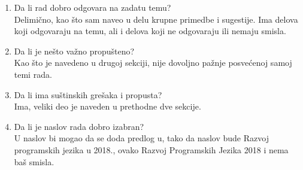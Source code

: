 \documentclass[a4paper]{report}
\begin{document}
\begin{enumerate}
\item Da li rad dobro odgovara na zadatu temu?\\
Delimično, kao što sam naveo u delu krupne primedbe i sugestije. Ima delova koji odgovaraju na temu, ali i delova koji ne odgovaraju ili nemaju smisla.
\item Da li je nešto važno propušteno?\\
Kao što je navedeno u drugoj sekciji, nije dovoljno pažnje posvećenoj samoj temi rada.
\item Da li ima suštinskih grešaka i propusta?\\
Ima, veliki deo je naveden u prethodne dve sekcije.
\item Da li je naslov rada dobro izabran?\\
U naslov bi mogao da se doda predlog u, tako da naslov bude Razvoj programskih jezika u 2018., ovako Razvoj Programskih Jezika 2018 i nema baš smisla.


\end{enumerate}
\end{document}
